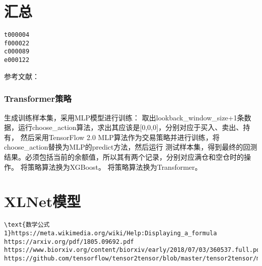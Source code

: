 \documentclass{article}
\begin{document}
\section{汇总}
\begin{lstlisting}
t000004
f000022
c000089
e000122
\end{lstlisting}

参考文献：\cite{r000001}


\subsubsection{Transformer策略}
生成训练样本集，采用MLP模型进行训练：\newline
取出lookback\_window\_size+1条数据，运行choose\_action算法，求出其应该是[0,0,0]，分别对应于买入、卖出、持有，
然后采用TensorFlow 2.0 MLP算法作为交易策略并进行训练，将choose\_action替换为MLP的predict方法，然后运行
测试样本集，得到最终的回测结果。必须包括当前的余额值，所以其有两个记录，分别对应满仓和空仓时的操作。\newline
将策略算法换为XGBoost。\newline
将策略算法换为Transformer。\newline



\section{XLNet模型}









\begin{lstlisting}
\text{数学公式1}https://meta.wikimedia.org/wiki/Help:Displaying_a_formula
https://arxiv.org/pdf/1805.09692.pdf
https://www.biorxiv.org/content/biorxiv/early/2018/07/03/360537.full.pdf
https://github.com/tensorflow/tensor2tensor/blob/master/tensor2tensor/models/evolved_transformer.py#L66

\end{lstlisting}





\newpage




\appendix
\end{document}
